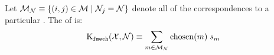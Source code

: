             Let $\mathcal{M}_{\mathcal{N}} \equiv \{(i, j) \in \mathcal{M} \mid
              \mathcal{N}_j = \mathcal{N}\}$ denote all of the correspondences to a particular
              \name{}.
            The \nscore{} of \aan{\name{}} is:
            \begin{equation}
                \operatorname{K_{{\tt{fmech}}}}(\mathcal{X}, \mathcal{N}) 
                \equiv 
                \sum_{m \in \mathcal{M}_{\mathcal{N}}} \operatorname{chosen}(m) \; s_m
            \end{equation}

            \namematch{}

